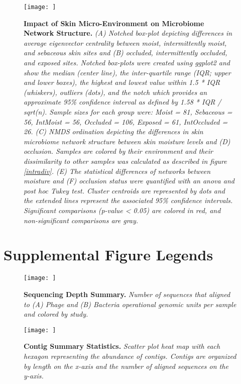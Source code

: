 \documentclass[12pt,]{article}
\newcommand{\beginsupplement}{%
        \setcounter{table}{0}
        \renewcommand{\thetable}{S\arabic{table}}%
        \setcounter{figure}{0}
        \renewcommand{\thefigure}{S\arabic{figure}}%
     }
\begin{document}
\begin{figure}[htbp]
\centering
\texttt{[image: ]}
\caption{\textbf{Impact of Skin Micro-Environment on Microbiome Network
Structure.} \emph{(A) Notched box-plot depicting differences in average
eigenvector centrality between moist, intermittently moist, and
sebaceous skin sites and (B) occluded, intermittently occluded, and
exposed sites. Notched box-plots were created using ggplot2 and show the
median (center line), the inter-quartile range (IQR; upper and lower
boxes), the highest and lowest value within 1.5 * IQR (whiskers),
outliers (dots), and the notch which provides an approximate 95\%
confidence interval as defined by 1.58 * IQR / sqrt(n). Sample sizes for
each group were: Moist = 81, Sebaceous = 56, IntMoist = 56, Occluded =
106, Exposed = 61, IntOccluded = 26. (C) NMDS ordination depicting the
differences in skin microbiome network structure between skin moisture
levels and (D) occlusion. Samples are colored by their environment and
their dissimilarity to other samples was calculated as described in
figure \ref{intradiv}. (E) The statistical differences of networks
between moisture and (F) occlusion status were quantified with an anova
and post hoc Tukey test. Cluster centroids are represented by dots and
the extended lines represent the associated 95\% confidence intervals.
Significant comparisons (p-value \textless{} 0.05) are colored in red,
and non-significant comparisons are gray.}\label{skinnetwork}}
\end{figure}

\newpage

\section{Supplemental Figure Legends}\label{supplemental-figure-legends}

\beginsupplement

\begin{figure}[htbp]
\centering
\texttt{[image: ]}
\caption{\textbf{Sequencing Depth Summary.} \emph{Number of sequences
that aligned to (A) Phage and (B) Bacteria operational genomic units per
sample and colored by study.}\label{SequenceStats}}
\end{figure}

\newpage

\begin{figure}[htbp]
\centering
\texttt{[image: ]}
\caption{\textbf{Contig Summary Statistics.} \emph{Scatter plot heat map
with each hexagon representing the abundance of contigs. Contigs are
organized by length on the x-axis and the number of aligned sequences on
the y-axis.}\label{ContigStats}}
\end{figure}
\end{document}
